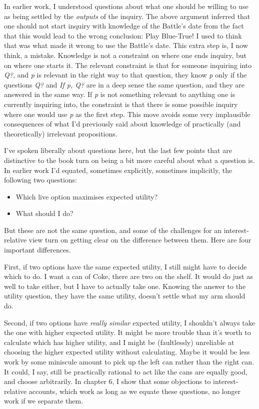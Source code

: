 \documentclass[
  11pt,
  letterpaper,
  DIV=11,
  numbers=noendperiod,
  twoside]{scrartcl}
\providecommand{\tightlist}{%
  \setlength{\itemsep}{0pt}\setlength{\parskip}{0pt}}
\begin{document}
In earlier work, I understood questions about what one should be willing
to use as being settled by the \emph{outputs} of the inquiry. The above
argument inferred that one should not start inquiry with knowledge of
the Battle's date from the fact that this would lead to the wrong
conclusion: Play Blue-True! I used to think that was what made it wrong
to use the Battle's date. This extra step is, I now think, a mistake.
Knowledge is not a constraint on where one ends inquiry, but on where
one starts it. The relevant constraint is that for someone inquiring
into \emph{Q?}, and \emph{p} is relevant in the right way to that
question, they know \emph{p} only if the questions \emph{Q?} and
\emph{If p, Q?} are in a deep sense the same question, and they are
answered in the same way. If \emph{p} is not something relevant to
anything one is currently inquiring into, the constraint is that there
is some possible inquiry where one would use \emph{p} as the first step.
This move avoids some very implausible consequences of what I'd
previously said about knowledge of practically (and theoretically)
irrelevant propositions.

I've spoken liberally about questions here, but the last few points that
are distinctive to the book turn on being a bit more careful about what
a question is. In earlier work I'd equated, sometimes explicitly,
sometimes implicitly, the following two questions:

\begin{itemize}
\tightlist
\item
  Which live option maximises expected utility?
\item
  What should I do?
\end{itemize}

But these are not the same question, and some of the challenges for an
interest-relative view turn on getting clear on the difference between
them. Here are four important differences.

First, if two options have the same expected utility, I still might have
to decide which to do. I want a can of Coke, there are two on the shelf.
It would do just as well to take either, but I have to actually take
one. Knowing the answer to the utility question, they have the same
utility, doesn't settle what my arm should do.

Second, if two options have \emph{really similar} expected utility, I
shouldn't always take the one with higher expected utility. It might be
more trouble than it's worth to calculate which has higher utility, and
I might be (faultlessly) unreliable at choosing the higher expected
utility without calculating. Maybe it would be less work by some
miniscule amount to pick up the left can rather than the right can. It
could, I say, still be practically rational to act like the cans are
equally good, and choose arbitrarily. In chapter 6, I show that some
objections to interest-relative accounts, which work as long as we
equate these questions, no longer work if we separate them.
\end{document}
